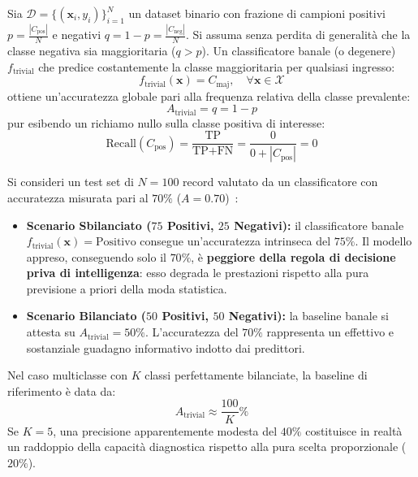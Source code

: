 \begin{theorem}
Sia $\mathcal{D} = \{(\mathbf{x}_i, y_i)\}_{i=1}^N$ un dataset binario con frazione di campioni positivi $p = \frac{|C_{\text{pos}}|}{N}$ e negativi $q = 1 - p = \frac{|C_{\text{neg}}|}{N}$. Si assuma senza perdita di generalità che la classe negativa sia maggioritaria ($q > p$). 
Un classificatore banale (o degenere) $f_{\text{trivial}}$ che predice costantemente la classe maggioritaria per qualsiasi ingresso:
\begin{equation}
    f_{\text{trivial}}(\mathbf{x}) = C_{\text{maj}}, \quad \forall \mathbf{x} \in \mathcal{X}
\end{equation}
ottiene un'accuratezza globale pari alla frequenza relativa della classe prevalente:
\begin{equation}
    A_{\text{trivial}} = q = 1 - p
\end{equation}
pur esibendo un richiamo nullo sulla classe positiva di interesse:
\begin{equation}
    \text{Recall}(C_{\text{pos}}) = \frac{\text{TP}}{\text{TP} + \text{FN}} = \frac{0}{0 + |C_{\text{pos}}|} = 0
\end{equation}
\end{theorem}

\begin{example}
Si consideri un test set di $N = 100$ record valutato da un classificatore con accuratezza misurata pari al $70\%$ ($A = 0.70$)~\cite{mannocci2026imbalanced}:
\begin{itemize}
    \item \textbf{Scenario Sbilanciato ($75$ Positivi, $25$ Negativi):} il classificatore banale $f_{\text{trivial}}(\mathbf{x}) = \text{Positivo}$ consegue un'accuratezza intrinseca del $75\%$. Il modello appreso, conseguendo solo il $70\%$, è \textbf{peggiore della regola di decisione priva di intelligenza}: esso degrada le prestazioni rispetto alla pura previsione a priori della moda statistica.
    \item \textbf{Scenario Bilanciato ($50$ Positivi, $50$ Negativi):} la baseline banale si attesta su $A_{\text{trivial}} = 50\%$. L'accuratezza del $70\%$ rappresenta un effettivo e sostanziale guadagno informativo indotto dai predittori.
\end{itemize}
Nel caso multiclasse con $K$ classi perfettamente bilanciate, la baseline di riferimento è data da:
\begin{equation}
    A_{\text{trivial}} \approx \frac{100}{K}\%
\end{equation}
Se $K = 5$, una precisione apparentemente modesta del $40\%$ costituisce in realtà un raddoppio della capacità diagnostica rispetto alla pura scelta proporzionale ($20\%$).
\end{example}

